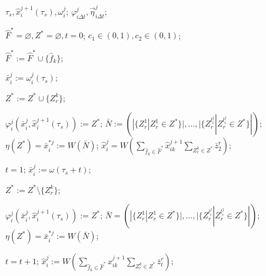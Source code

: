 \documentclass[preview,convert={density=600,outext=.jpg},border=7pt]{standalone}
\begin{document}
	
	\begin{algorithmic}[1]
		\Require $\tau_s, \hat{x}_i^{j+1}(\tau_s), \omega_i^j$;
		\Ensure $\varphi_{i\Delta t}^j, \vec\eta_{i\Delta t}^j$;

		\State $\hat{F}^*=\varnothing,Z^*=\varnothing,t=0$; 
		\State $c_1\in(0,1), c_2\in(0,1)$; 

		\Statex {}
				
		 \label{alst:init_start}
			 \label{alst:select_f}
				\State $\hat{F}^*:=\hat{F}^*\cup\{\hat{f}_k\}$;
			\EndIf
		\EndFor
		
		\State $\bar x_i^j:=\omega_i^j(\tau_s)$;
		
				 \label{alst:select_z}
					\State $Z^*:=Z^*\cup\{Z_r^k\}$;
				\EndIf
			\EndFor
		\EndFor
		
		\State $\varphi_i^j(\bar x_i^j,\hat{x}_i^{j+1}(\tau_s)) := Z^*$; \label{alst:init_state}
		\State $\bar N:=(|\{Z_r^1|Z_r^1\in Z^*\}|,\dots,|\{Z_r^{l_i^j}|Z_r^{l_i^j}\in Z^*\}|)$; \label{alst:init_calc_out1}
		\State $\eta(Z^*)=\bar{x}_i^{*j}:=W(\bar N)$;  \label{alst:init_calc_out3}
		\State $\hat x_i^j=W(\sum_{\hat f_k\in\hat F^*}\hat x_{ik}^{j+1}\sum_{Z_r^k\in Z^*}\bar z_2^r)$; \label{alst:init_end}
		
		\Statex {}
		\State $t=1$;
		 \label{alst:cycle_start}
			\State $\bar{x}_i^j:=\omega(\tau_s+t)$;
		
				 \label{alst:update_z}
					\State $Z^*:=Z^*\setminus\{Z_r^k\}$;
				\EndIf
			\EndFor
		
			\State $\varphi_i^j(\bar x_i^j,\hat{x}_i^{j+1}(\tau_s)) := Z^*$; \label{alst:calc_state2}
			\State $\bar N=(|\{Z_r^1|Z_r^1\in Z^*\}|,\dots,|\{Z_r^{l_i^j}|Z_r^{l_i^j}\in Z^*\}|)$; \label{alst:calc_out1}
			\State $\eta(Z^*)=\bar{x}_i^{*j}:=W(\bar N)$; \label{alst:calc_out3}
		
			\State $t=t+1$;
				\State $\hat{x}_i^j:=W(\sum_{\hat f_k\in\hat F^*}\hat x_{ik}^{j+1}\sum_{Z_r^k\in Z^*}\bar z_t^r)$; \label{alst:calc_state1}
			\EndIf
		\EndWhile \label{alst:cycle_end}
	\end{algorithmic}
\end{document}
